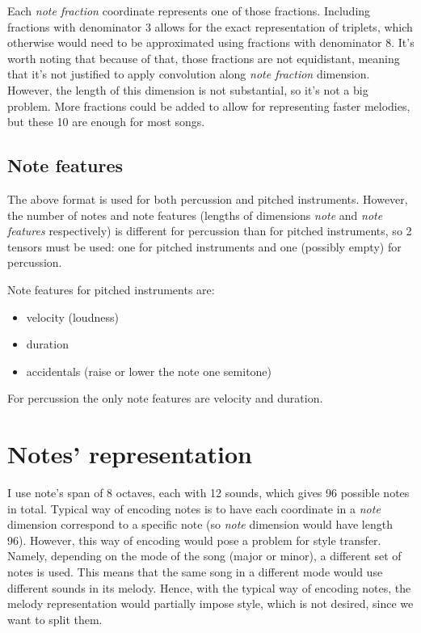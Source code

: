 \documentclass[en]{pracamgr}
\begin{document}
Each \emph{note fraction} coordinate represents one of those fractions.
Including fractions with denominator 3 allows for the exact representation of triplets, which otherwise would need to be approximated using fractions with denominator 8.
It's worth noting that because of that, those fractions are not equidistant, meaning that it's not justified to apply convolution along \emph{note fraction} dimension.
However, the length of this dimension is not substantial, so it's not a big problem. More fractions could be added to allow for representing faster melodies, but these 10 are enough for most songs.

\subsection{Note features}

The above format is used for both percussion and pitched instruments.
However, the number of notes and note features (lengths of dimensions \emph{note} and \emph{note features} respectively) is different for percussion than for pitched instruments, so 2 tensors must be used: one for pitched instruments and one (possibly empty) for percussion.

Note features for pitched instruments are:
\begin{itemize}
    \item velocity (loudness)
    \item duration
    \item accidentals (raise or lower the note one semitone)
\end{itemize}

For percussion the only note features are velocity and duration.

\section{Notes' representation}

I use note's span of 8 octaves, each with 12 sounds, which gives 96 possible notes in total.
Typical way of encoding notes is to have each coordinate in a \emph{note} dimension correspond to a specific note (so \emph{note} dimension would have length 96).
However, this way of encoding would pose a problem for style transfer.
Namely, depending on the mode of the song (major or minor), a different set of notes is used.
This means that the same song in a different mode would use different sounds in its melody.
Hence, with the typical way of encoding notes, the melody representation would partially impose style, which is not desired, since we want to split them.
\end{document}
